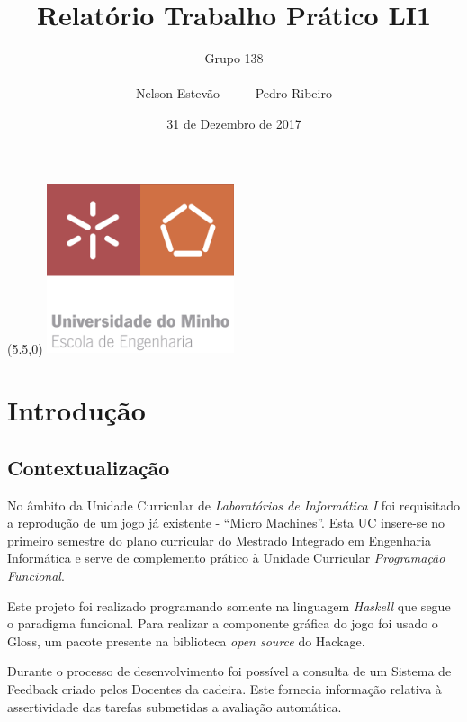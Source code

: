 \documentclass[a4paper]{report}
\title{Relatório Trabalho Prático LI1}
\author{Grupo 138 \\ \\
Nelson Estevão \ \ \ \ \ Pedro Ribeiro}
\date{31 de Dezembro de 2017}
\begin{document}
\begin{textblock}{5}(5.5,0)
  \centering
  \includegraphics[height=5cm]{EEUM_logo}
\end{textblock}

\maketitle

\tableofcontents

\listoffigures


\chapter{Introdução}

  \section{Contextualização}
  No âmbito da Unidade Curricular de \emph{Laboratórios de Informática I} foi
  requisitado a reprodução de um jogo já existente - ``Micro Machines''. Esta UC
  insere-se no primeiro semestre do plano curricular do Mestrado Integrado em
  Engenharia Informática e serve de complemento prático à Unidade Curricular
  \emph{Programação Funcional}.

  Este projeto foi realizado programando somente na linguagem \emph{Haskell} que
  segue o paradigma funcional. Para realizar a componente gráfica do jogo foi
  usado o Gloss, um pacote presente na biblioteca \emph{open source} do
  Hackage.

  Durante o processo de desenvolvimento foi possível a consulta de um Sistema de
  Feedback criado pelos Docentes da cadeira. Este fornecia informação relativa à
  assertividade das tarefas submetidas a avaliação automática.
\end{document}
